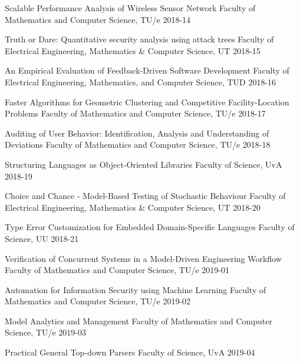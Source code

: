 \begin{multicols}{2}
         {Scalable Performance Analysis of Wireless Sensor Network}
         {Faculty of Mathematics and Computer Science, TU/e}
         {2018-14}

         {Truth or Dare: Quantitative security analysis using attack trees}
         {Faculty of Electrical Engineering, Mathematics \& Computer Science, UT}
         {2018-15}

         {An Empirical Evaluation of Feedback-Driven Software Development}
         {Faculty of Electrical Engineering, Mathematics, and Computer Science, TUD}
         {2018-16}
		 
         {Faster Algorithms for Geometric Clustering and Competitive Facility-Location Problems}
         {Faculty of Mathematics and Computer Science, TU/e}
         {2018-17}
		 
         {Auditing of User Behavior: Identification, Analysis and Understanding of Deviations}
         {Faculty of Mathematics and Computer Science, TU/e}
         {2018-18}

         {Structuring Languages as Object-Oriented Libraries}
         {Faculty of Science, UvA}
         {2018-19}

         {Choice and Chance - Model-Based Testing of Stochastic Behaviour}
         {Faculty of Electrical Engineering, Mathematics \& Computer Science, UT}
         {2018-20}

         {Type Error Customization for Embedded Domain-Specific Languages}
         {Faculty of Science, UU}
         {2018-21}

         {Verification of Concurrent Systems in a Model-Driven Engineering Workflow}
         {Faculty of Mathematics and Computer Science, TU/e}
         {2019-01}

         {Automation for Information Security using Machine Learning}
         {Faculty of Mathematics and Computer Science, TU/e}
         {2019-02}

         {Model Analytics and Management}
         {Faculty of Mathematics and Computer Science, TU/e}
         {2019-03}

         {Practical General Top-down Parsers}
         {Faculty of Science, UvA}
         {2019-04}


\end{multicols}
